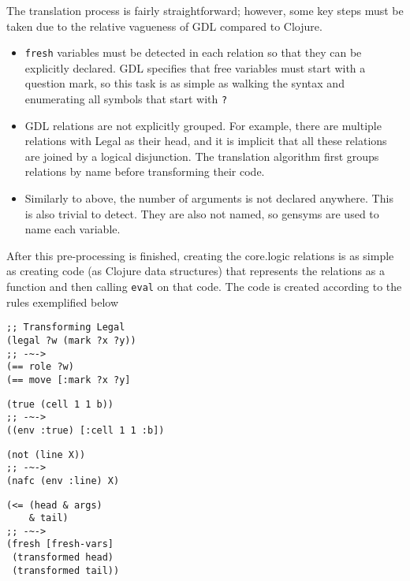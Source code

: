 \documentclass[letterpaper]{article}
\begin{document}
The translation process is fairly straightforward; however, some key steps must be taken due to the relative vagueness of GDL compared to Clojure.
\begin{itemize}
\item \texttt{fresh} variables must be detected in each relation so that they can be explicitly declared. GDL specifies that free variables must start with a question mark, so this task is as simple as walking the syntax and enumerating all symbols that start with \texttt{?}
\item GDL relations are not explicitly grouped. For example, there are multiple relations with Legal as their head, and it is implicit that all these relations are joined by a logical disjunction. The translation algorithm first groups relations by name before transforming their code.
\item Similarly to above, the number of arguments is not declared anywhere. This is also trivial to detect. They are also not named, so gensyms are used to name each variable.
\end{itemize}

After this pre-processing is finished, creating the core.logic relations is as simple as creating code (as Clojure data structures) that represents the relations as a function and then calling \texttt{eval} on that code. The code is created according to the rules exemplified below
\begin{lstlisting}[frame=single, caption=Reflexive head calls turn into unifications]
;; Transforming Legal
(legal ?w (mark ?x ?y))
;; -~->
(== role ?w)
(== move [:mark ?x ?y]
\end{lstlisting}

\begin{lstlisting}[frame=single,caption=All other relations reference the environment]
(true (cell 1 1 b))
;; -~->
((env :true) [:cell 1 1 :b])
\end{lstlisting}

\begin{lstlisting}[frame=single,caption=not turns into negation as failure constraint (nafc)]
(not (line X))
;; -~->
(nafc (env :line) X)
\end{lstlisting}

\begin{lstlisting}[frame=single,caption={\textless= relations are joined in a fresh block}]
(<= (head & args)
    & tail)
;; -~->
(fresh [fresh-vars]
 (transformed head)
 (transformed tail))
\end{lstlisting}
\end{document}
